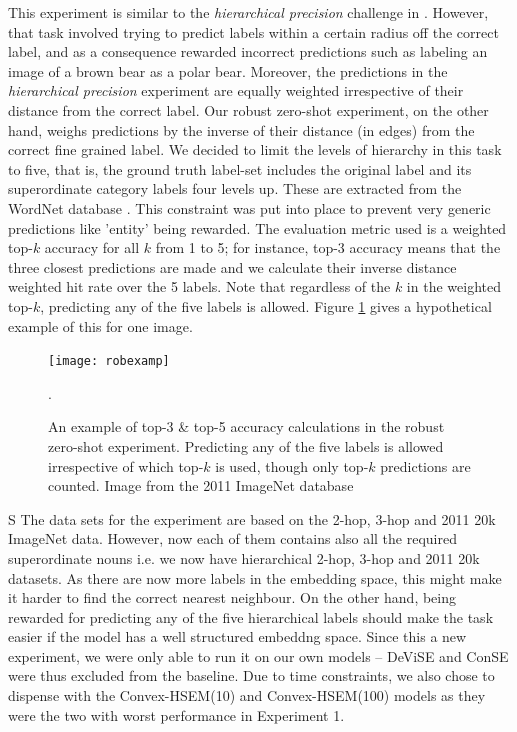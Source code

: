 \documentclass[12pt]{report}
\begin{document}
This experiment is similar to the \textit{hierarchical precision} challenge in \cite{Frome2013}. However, that task involved trying to predict labels within a certain radius off the correct label, and as a consequence rewarded incorrect predictions such as labeling an image of a brown bear as a polar bear. Moreover, the predictions in the \textit{hierarchical precision} experiment are equally weighted irrespective of their distance from the correct label. Our robust zero-shot experiment, on the other hand, weighs predictions by the inverse of their distance (in edges) from the correct fine grained label. We decided to limit the levels of hierarchy in this task to five, that is, the ground truth label-set includes the original label and its superordinate category labels four levels up. These are extracted from the WordNet database \cite{Miller1995}. This constraint was put into place to prevent very generic predictions like 'entity' being rewarded. The evaluation metric used is a weighted top-$k$ accuracy for all $k$ from 1 to 5; for instance,  top-$3$ accuracy means that the three closest predictions are made and we calculate their inverse distance weighted hit rate over the 5 labels. Note that regardless of the $k$ in the weighted top-$k$, predicting any of the five labels is allowed. Figure \ref{fig:robexp} gives a hypothetical example of this for one image. 
\begin{figure}
  \centering
  \texttt{[image: robexamp]}
  \caption{An example of top-3 \& top-5 accuracy calculations in the robust zero-shot experiment. Predicting any of the five labels is allowed irrespective of which top-$k$ is used, though only top-$k$ predictions are counted. Image from the 2011 ImageNet database \cite{JiaDeng2009}}.
  \label{fig:robexp}
\end{figure}
S
The data sets for the experiment are based on the 2-hop, 3-hop and 2011 20k ImageNet data. However, now each of them contains also all the required superordinate nouns i.e. we now have hierarchical 2-hop, 3-hop and 2011 20k datasets. As there are now more labels in the embedding space, this might make it harder to find the correct nearest neighbour. On the other hand, being rewarded for predicting any of the five hierarchical labels should make the task easier if the model has a well structured embeddng space. Since this a new experiment, we were only able to run it on our own models -- DeViSE and ConSE were thus excluded from the baseline. Due to time constraints, we also chose to dispense with the Convex-HSEM(10) and Convex-HSEM(100) models as they were the two with worst performance in Experiment 1. 
\end{document}
